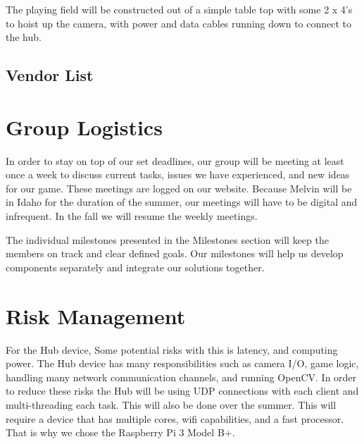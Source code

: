 \documentclass[11pt]{ieeeconf}
\begin{document}
The playing field will be constructed out of a simple table top with some 2 x 4's to hoist up the camera, with power and data cables running down to connect to the hub.

\subsection{Vendor List}

\section{Group Logistics}
In order to stay on top of our set deadlines, our group will be meeting at least once a week to discuss current tasks, issues we have experienced, and new ideas for our game. These meetings are logged on our website. Because Melvin will be in Idaho for the duration of the summer, our meetings will have to be digital and infrequent. In the fall we will resume the weekly meetings.

The individual milestones presented in the Milestones section will keep the members on track and clear defined goals. Our milestones will help us develop components separately and integrate our solutions together.  

\section{Risk Management}
For the Hub device, Some potential risks with this is latency, and computing power. The Hub device has many responsibilities such as camera I/O, game logic, handling many network communication channels, and running OpenCV. In order to reduce these risks the Hub will be using UDP connections with each client and multi-threading each task. This will also be done over the summer. This will require a device that has multiple cores, wifi capabilities, and a fast processor. That is why we chose the Raspberry Pi 3 Model B+.
\end{document}
